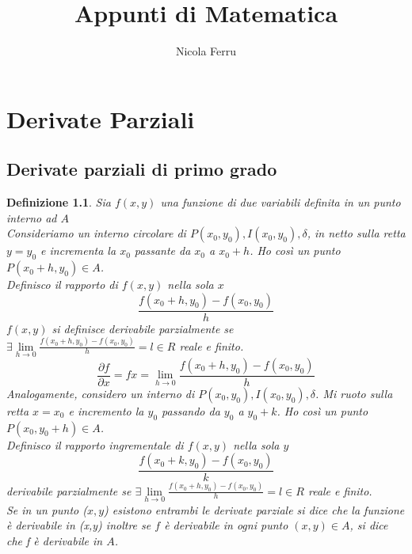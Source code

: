 \documentclass{book}
\title{Appunti di Matematica}
\author{Nicola Ferru}
\date{}
\newtheorem{defi}{Definizione}
\begin{document}


\tableofcontents
\listoftables
\listoffigures




\chapter{Derivate Parziali}
\section{Derivate parziali di primo grado}
\begin{defi}
  Sia $f(x,y)$ una funzione di due variabili definita in un punto interno ad $A$\\
  Consideriamo un interno circolare di $P(x_0,y_0),I(x_0,y_0), \delta$, in netto sulla retta $y=y_0$ e
  incrementa la $x_0$ passante da $x_0$ a $x_0+h$. Ho così un punto $P(x_0+h,y_0)\in A$.\\
  Definisco il rapporto di $f(x,y)$ nella sola $x$
  \begin{equation}
    \frac{f(x_0+h,y_0)-f(x_0,y_0)}{h}
  \end{equation}
  $f(x,y)$ si definisce {\color{red} derivabile parzialmente} se $\exists \lim\limits_{h\to 0}\frac{f(x_0+h,y_0)-f(x_0,y_0)}{h} = l\in R$ reale e finito.
  \begin{equation}
    \frac{\partial f}{\partial x} =fx=\lim\limits_{h\to 0}\frac{f(x_0+h,y_0)-f(x_0,y_0)}{h}
  \end{equation}
  Analogamente, considero un interno di $P(x_0,y_0), I(x_0,y_0),\delta$. Mi ruoto sulla retta $x=x_0$ e
  incremento la $y_0$ passando da $y_0$ a $y_0+k$. Ho così un punto $P(x_0,y_0+h)\in A$.\\
  Definisco il rapporto ingrementale di $f(x,y)$ nella sola $y$
  \begin{equation*}
    \frac{f(x_0+k,y_0)-f(x_0,y_0)}{k}
  \end{equation*}
  {\color{red} derivabile parzialmente} se $\exists \lim\limits_{h\to 0}\frac{f(x_0+h,y_0)-f(x_0,y_0)}{h} =
  l\in R$ reale e finito.\\
  Se in un punto ($x,y$) esistono entrambi le derivate parziale si dice che la funzione è {\color{red} derivabile}
  in (x,y) inoltre se $f$ è derivabile in ogni punto $(x,y)\in A$, si dice che f è derivabile in $A$.
\end{defi}
\end{document}
